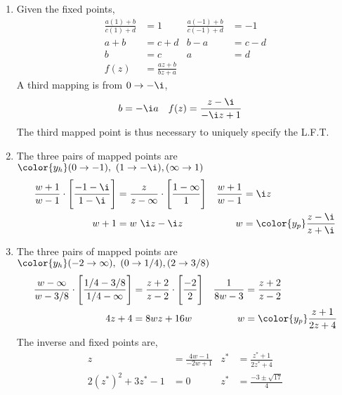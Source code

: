\begin{enumerate}
    \item Given the fixed points,
          \begin{align}
              \frac{a(1) + b}{c(1) + d}   & = 1                     &
              \frac{a(-1) + b}{c(-1) + d} & = -1                      \\
              a + b                       & = c + d                 &
              b - a                       & = c - d                   \\
              b                           & = c                     &
              a                           & = d                       \\
              f(z)                        & = \frac{az + b}{bz + a}
          \end{align}
          A third mapping is from $ 0 \to -\i $,
          \begin{align}
              b & = -\i a & f(z) & = \frac{z - \i}{-\i z + 1}
          \end{align}
          The third mapped point is thus necessary to uniquely specify the L.F.T.

    \item The three pairs of mapped points are
          $\color{y_h}  (0 \to -1),\ (1 \to -\i), (\infty \to 1) $
          \begin{align}
              \frac{w + 1}{w - 1} \cdot \Bigg[\frac{-1 - \i}{1 - \i}\Bigg]
                              & = \frac{z}{z - \infty} \cdot
              \Bigg[ \frac{1 - \infty}{1}
              \Bigg]          &
              \frac{w+1}{w-1} & = \i z                                \\
              w + 1           & = w\ \i z - \i z                    &
              w               & = \color{y_p} \frac{z - \i}{z + \i}
          \end{align}

    \item The three pairs of mapped points are
          $\color{y_h}  (-2 \to \infty),\ (0 \to 1/4), (2 \to 3/8) $
          \begin{align}
              \frac{w - \infty}{w - 3/8} \cdot \Bigg[\frac{1/4 - 3/8}{1/4 - \infty}\Bigg]
                             & = \frac{z+2}{z - 2 } \cdot
              \Bigg[ \frac{-2}{2}
              \Bigg]         &
              \frac{1}{8w-3} & = \frac{z+2}{z-2}                    \\
              4z + 4         & = 8wz + 16w                        &
              w              & = \color{y_p} \frac{z + 1}{2z + 4}
          \end{align}
          The inverse and fixed points are,
          \begin{align}
              z                   & = \frac{4w - 1}{-2w + 1}     &
              z^*                 & = \frac{z^* + 1}{2z^* + 4}     \\
              2(z^*)^2 + 3z^* - 1 & = 0                          &
              z^*                 & = \frac{-3 \pm \sqrt{17}}{4}
          \end{align}


\end{enumerate}
